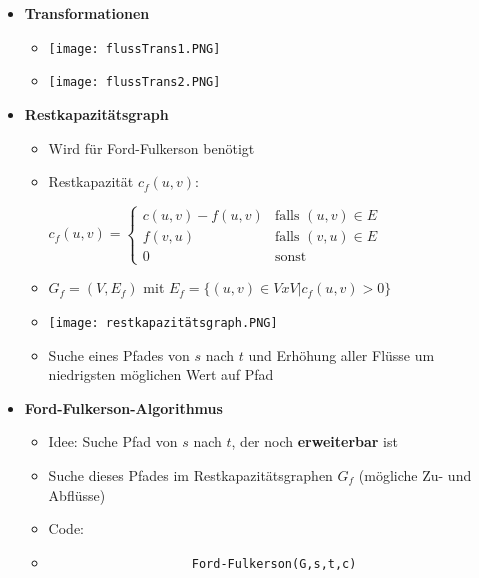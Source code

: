 \begin{itemize}
\pagebreak

        \item \textbf{Transformationen}
            \begin{itemize}
                \item[] \texttt{[image: flussTrans1.PNG]}
                \item[] \texttt{[image: flussTrans2.PNG]}
            \end{itemize}

        \item \textbf{Restkapazitätsgraph}
            \begin{itemize}
                \item Wird für Ford-Fulkerson benötigt
                \item Restkapazität $c_f(u,v)$: \\
                        \centerline{$c_f(u,v) = \begin{cases}
                                                c(u,v) - f(u,v) & \text{falls $(u,v) \in E$} \\
                                                f(v,u) & \text{falls $(v,u) \in E$} \\
                                                0 & \text{sonst}
                                                \end{cases}$}
                \item $G_f = (V, E_f)$ mit $E_f = \{(u,v) \in V x V | c_f(u,v) > 0 \}$
                \item[] \texttt{[image: restkapazitätsgraph.PNG]}
                \item Suche eines Pfades von $s$ nach $t$ und Erhöhung aller Flüsse um niedrigsten möglichen Wert auf Pfad
            \end{itemize}


        \item \textbf{Ford-Fulkerson-Algorithmus}
            \begin{itemize}
                \item Idee: Suche Pfad von $s$ nach $t$, der noch \textbf{erweiterbar} ist
                \item Suche dieses Pfades im Restkapazitätsgraphen $G_f$ (mögliche Zu- und Abflüsse)
                \item Code:
                \item[]
                    \begin{verbatim}
                    Ford-Fulkerson(G,s,t,c)


\end{verbatim}
\end{itemize}
\end{itemize}
